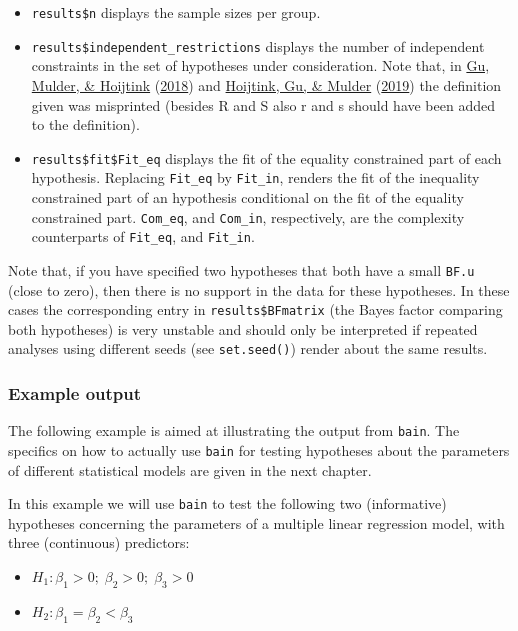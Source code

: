 \documentclass[
]{book}
\providecommand{\tightlist}{%
  \setlength{\itemsep}{0pt}\setlength{\parskip}{0pt}}
\begin{document}
\begin{itemize}
\item
  \texttt{results\$n} displays the sample sizes per group.
\item
  \texttt{results\$independent\_restrictions} displays the number of
  independent constraints in the set of hypotheses under consideration. Note that,
  in \protect\hyperlink{ref-gu2018approximated}{Gu, Mulder, \& Hoijtink} (\protect\hyperlink{ref-gu2018approximated}{2018}) and \protect\hyperlink{ref-hoijtink2019bayesian}{Hoijtink, Gu, \& Mulder} (\protect\hyperlink{ref-hoijtink2019bayesian}{2019}) the
  definition given was misprinted (besides R and S also r and s should have been
  added to the definition).
\item
  \texttt{results\$fit\$Fit\_eq} displays the fit of the equality constrained
  part of each hypothesis. Replacing \texttt{Fit\_eq} by \texttt{Fit\_in}, renders
  the fit of the inequality constrained part of an hypothesis conditional on
  the fit of the equality constrained part. \texttt{Com\_eq}, and \texttt{Com\_in},
  respectively, are the complexity counterparts of \texttt{Fit\_eq}, and
  \texttt{Fit\_in}.
\end{itemize}

Note that, if you have specified two hypotheses that both have a small
\texttt{BF.u} (close to zero), then there is no support in the data for these
hypotheses. In these cases the corresponding entry in \texttt{results\$BFmatrix}
(the Bayes factor comparing both hypotheses) is very unstable and should
only be interpreted if repeated analyses using different seeds
(see \texttt{set.seed()}) render about the same results.

\hypertarget{example-output}{%
\subsubsection{Example output}\label{example-output}}

The following example is aimed at illustrating the output from \texttt{bain}. The specifics on how to actually use \texttt{bain} for testing hypotheses about the parameters of different statistical models are given in the next chapter.

In this example we will use \texttt{bain} to test the following two (informative) hypotheses concerning the parameters of a multiple linear regression model, with three (continuous) predictors:

\begin{itemize}
\tightlist
\item
  \(H_1: \beta_1 > 0;\; \beta_2 > 0;\; \beta_3 >0\)
\item
  \(H_2: \beta_1 = \beta_2 < \beta_3\)
\end{itemize}
\end{document}
